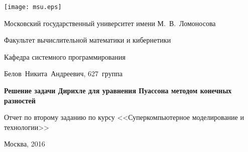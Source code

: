 \thispagestyle{empty}

\begin{center}
  \texttt{[image: msu.eps]}\par
  Московский государственный университет имени М.~В.~Ломоносова\par
  Факультет вычислительной математики и кибернетики\par
  Кафедра системного программирования\par

  \vspace{3cm}

  {\large
    Белов~Никита~Андреевич, 627~группа
  }\par

  \vspace{1cm}

  \textbf{
    {\Large
      Решение задачи Дирихле для уравнения Пуассона методом конечных разностей
    }
  }\par
\end{center}

\vspace{1cm}

\begin{center}
  Отчет по второму заданию по курсу <<Суперкомпьютерное моделирование и технологии>>\par
\end{center}

\vspace{7cm}

\begin{center}
  Москва, 2016
\end{center}

\clearpage
